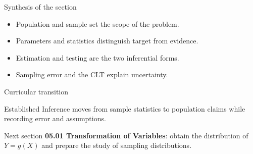 \documentclass[10pt,aspectratio=169]{beamer}
\begin{document}
\begin{frame}{Synthesis of the section}
  \footnotesize
  \begin{itemize}\itemsep=0.12cm
    \item Population and sample set the scope of the problem.
    \item Parameters and statistics distinguish target from evidence.
    \item Estimation and testing are the two inferential forms.
    \item Sampling error and the CLT explain uncertainty.
  \end{itemize}
\end{frame}

\begin{frame}{Curricular transition}
  \footnotesize
  \begin{block}{Established}
    Inference moves from sample statistics to population claims while recording
    error and assumptions.
  \end{block}
  \begin{alertblock}{Next section}
    \textbf{05.01 Transformation of Variables}: obtain the distribution of
    $Y=g(X)$ and prepare the study of sampling distributions.
  \end{alertblock}
\end{frame}
\end{document}
